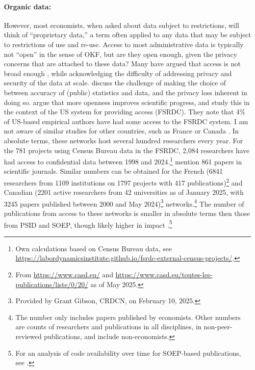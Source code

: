 \documentclass{article}
\begin{document}
\paragraph{Organic data:} However, most economists, when asked about data subject to restrictions, will think of ``proprietary data,'' a term often applied to any data that may be subject to restrictions of use and re-use. Access to most administrative data is typically not ``open'' in the sense of OKF, but are they open enough, given the privacy concerns that are attached to these data? Many have argued that access is not broad enough \citep{card_expanding_2010,einav_economics_2014}, while acknowledging the difficulty of addressing privacy and security of the data at scale. \citet{abowd_economic_2018} discuss the challenge of making the choice of between accuracy of (public) statistics and data, and the privacy loss inherent in doing so. \citet{nagaraj_improving_2020} argue that more openness improves scientific progress, and \citet{nagaraj_how_2023} study this in the context of the US system for providing access (\ac{FSRDC}). They note that 4\% of US-based empirical authors have had some access to the FSRDC system. I am not aware of similar studies for other countries, such as France \citep[the equivalent system is the \ac{CASD}, ][]{gadouche_centre_2019} or Canada \citep{currie2015social}. In absolute terms, these networks host several hundred researchers every year. For the 781 projects using Census Bureau data in the \ac{FSRDC}, 2,084 researchers  have had access to confidential data between 1998 and 2024.\footnote{Own calculations based on Census Bureau data, see \url{https://labordynamicsinstitute.github.io/fsrdc-external-census-projects/}.} \citet{nagaraj_how_2023} mention 861 papers in scientific journals. Similar numbers can be obtained for the French (6841 researchers from 1109 institutions on 1797 projects with 417 publications)\footnote{From \url{https://www.casd.eu/} and \url{https://www.casd.eu/toutes-les-publications/liste/0/20/} as of May 2025.}
and Canadian (2201 active researchers from 42 universities as of January 2025, with 3245 papers published between 2000 and May 2024)\footnote{Provided by Grant Gibson, CRDCN, on February 10, 2025.} networks.\footnote{The \citet{nagaraj_how_2023} number only includes papers published by economists. Other numbers are counts of researchers and publications in all disciplines, in non-peer-reviewed publications, and include non-economists.} The number of publications from access to these networks is smaller in absolute terms then those from PSID and SOEP, though likely higher in impact \citep{nagaraj_how_2023}.\footnote{For an analysis of code availability over time for SOEP-based publications, see \citet{fink_replication_2025}.}
\end{document}
